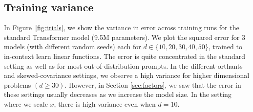 \clearpage
\subsection{Training variance}
\label{app:variance}
In Figure~\ref{fig:trials}, we show the variance in error across training runs for the standard Transformer model (9.5M parameters). We plot the squared error for 3 models (with different random seeds) each for $d \in\{10, 20, 30, 40, 50\} $, trained to in-context learn linear functions.
The error is quite concentrated in the standard setting as well as for most out-of-distribution prompts. In the different-orthants and skewed-covariance settings, we observe a high variance for higher dimensional problems $(d \geq 30)$. However, in Section \ref{sec:factors}, we saw that the error in these settings usually decreases as we increase the model size. 
In the setting where we scale $x$, there is high variance even when $d=10$.


